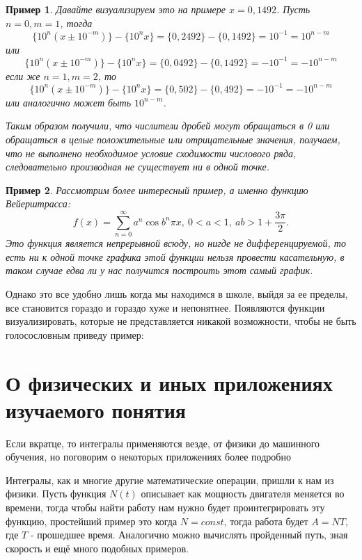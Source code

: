 \documentclass{book} %
\newtheorem{example}{Пример}[chapter] %
\theoremstyle{definition}
\theoremstyle{remark}
\begin{document}
\begin{example}
			Давайте визуализируем это на примере $x = 0,1492$. Пусть $n=0, m=1$, тогда
			\begin{equation*}
				\{10^n(x \pm 10^{-m})\} - \{10^nx\} = \{0,2492\} - \{0,1492\} = 10^{-1} = 10^{n-m}
			\end{equation*}
			или 
			\begin{equation*}
				\{10^n(x \pm 10^{-m})\} - \{10^nx\} = \{0,0492\} - \{0,1492\} = -10^{-1} = -10^{n-m}
			\end{equation*}
			если же $n = 1, m = 2$, то
			\begin{equation*}
				\{10^n(x \pm  10^{-m})\} - \{10^nx\} = \{0,502\} - \{0,492\} = -10^{-1} = -10^{n-m}
			\end{equation*}
			или аналогично может быть $10^{n-m}$.
			
			Таким образом получили, что числители дробей могут обращаться в 0 или обращаться в целые положительные или отрицательные значения, получаем, что не выполнено необходимое условие сходимости числового ряда, следовательно производная не существует ни в одной точке.
		\end{example}
		\begin{example}
		Рассмотрим более интересный пример, а именно функцию Вейерштрасса:
		\begin{equation*}
			f(x) = \sum\limits_{n=0}^{\infty} a^n \cos{b^n \pi x}, \ 0 < a < 1, \ ab > 1 + \dfrac{3\pi}2.
		\end{equation*}
		Это функция является непрерывной всюду, но нигде не дифференцируемой, то есть ни к одной точке графика этой функции нельзя провести касательную, в таком случае едва ли у нас получится построить этот самый график.
		\end{example}
		
		
		Однако это все удобно лишь когда мы находимся в школе, выйдя за ее пределы, все становится гораздо и гораздо хуже и непонятнее. Появляются функции визуализировать, которые не представляется никакой возможности, чтобы не быть голосословным приведу пример:
	\section{О физических и иных приложениях изучаемого понятия}
		Если вкратце, то интегралы применяются везде, от физики до машинного обучения, но поговорим о некоторых приложениях более подробно
		
		Интегралы, как и многие другие математические операции, пришли к нам из физики. Пусть функция $N(t)$ описывает как мощность двигателя меняется во времени, тогда чтобы найти работу нам нужно будет проинтегрировать эту функцию, простейший пример это когда $ N = const$, тогда работа будет $A = NT$, где $T$ - прошедшее время.	Аналогично можно вычислять пройденный путь, зная скорость и ещё много подобных примеров.
		
\end{document}
